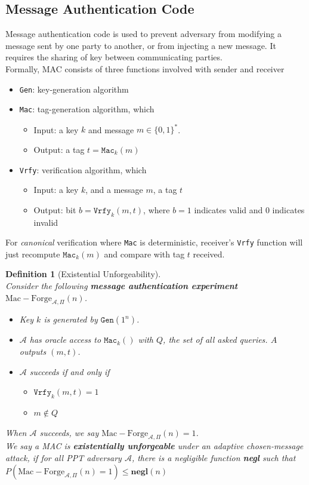 \documentclass[12pt]{article}
\newcommand\MacForge{\mathrm{Mac-Forge}}
\newtheorem{definition}{Definition}[section]
\theoremstyle{definition}
\begin{document}
\subsection{Message Authentication Code}
Message authentication code is used to prevent adversary from modifying a message sent by one party to another, or from injecting a new message. It requires the sharing of key between communicating parties.\\
Formally, MAC consists of three functions involved with sender and receiver 
\begin{itemize}
  \item \texttt{Gen}: key-generation algorithm
  \item \texttt{Mac}: tag-generation algorithm, which
  \begin{itemize}
    \item Input: a key $k$ and message $m\in\{0,1\}^\ast$.
    \item Output: a tag $t=\texttt{Mac}_k(m)$
  \end{itemize}
  \item \texttt{Vrfy}: verification algorithm, which
  \begin{itemize}
    \item Input: a key $k$, and a message $m$, a tag $t$
    \item Output: bit $b=\texttt{Vrfy}_k(m,t)$, where $b=1$ indicates valid and $0$ indicates invalid
  \end{itemize}
\end{itemize}
For \textit{canonical} verification where \texttt{Mac} is deterministic, receiver's \texttt{Vrfy} function will just recompute $\texttt{Mac}_k(m)$ and compare with tag $t$ received.
\begin{definition}[Existential Unforgeability]
\hfill\\\normalfont Consider the following \textbf{message authentication experiment} $\MacForge_{\mathcal{A}, \Pi}(n)$.
\begin{itemize}
  \item Key $k$ is generated by $\texttt{Gen}(1^n)$.
  \item $\mathcal{A}$ has oracle access to $\texttt{Mac}_k()$ with $Q$, the set of all asked queries. $A$ outputs $(m,t)$.
  \item $\mathcal{A}$ succeeds if and only if 
  \begin{itemize}
    \item $\texttt{Vrfy}_k(m,t)=1$
    \item $m\not\in Q$
  \end{itemize}
\end{itemize}
When $\mathcal{A}$ succeeds, we say $\MacForge_{\mathcal{A},\Pi}(n)=1$.\\
We say a MAC is \textbf{existentially unforgeable} under an adaptive chosen-message attack, if for all PPT adversary $\mathcal{A}$, there is a negligible function \textbf{negl} such that
$
P(\MacForge_{\mathcal{A},\Pi}(n)=1)\leq \mathbf{negl}(n)
$
\end{definition}
\end{document}
